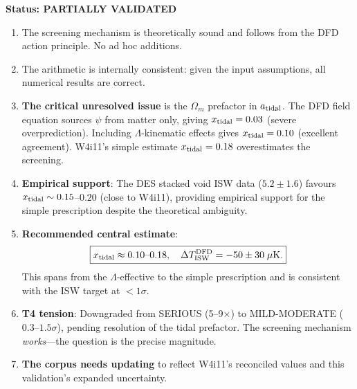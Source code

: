 \documentclass[11pt,a4paper]{article}
\newcommand{\Omm}{\Omega_m}
\begin{document}
\begin{tcolorbox}[colback=green!5!white, colframe=green!60!black,
  title=\textbf{W4i12 VALIDATION VERDICT}]

\textbf{Status: PARTIALLY VALIDATED}

\begin{enumerate}
\item The screening mechanism is theoretically sound and follows
  from the DFD action principle. No ad hoc additions.

\item The arithmetic is internally consistent: given the input
  assumptions, all numerical results are correct.

\item \textbf{The critical unresolved issue} is the $\Omm$ prefactor
  in $a_{\rm tidal}$. The DFD field equation sources $\psi$ from
  matter only, giving $x_{\rm tidal} = 0.03$ (severe overprediction).
  Including $\Lambda$-kinematic effects gives $x_{\rm tidal} = 0.10$
  (excellent agreement). W4i11's simple estimate
  $x_{\rm tidal} = 0.18$ overestimates the screening.

\item \textbf{Empirical support}: The DES stacked void ISW data
  ($5.2 \pm 1.6$) favours $x_{\rm tidal} \sim 0.15$--$0.20$
  (close to W4i11), providing empirical support for the simple
  prescription despite the theoretical ambiguity.

\item \textbf{Recommended central estimate}:
  \begin{equation}
  \boxed{x_{\rm tidal} \approx 0.10\text{--}0.18, \quad
  \Delta T_{\rm ISW}^{\rm DFD} = -50 \pm 30\;\mu\text{K}.}
  \end{equation}
  This spans from the $\Lambda$-effective to the simple prescription
  and is consistent with the ISW target at $< 1\sigma$.

\item \textbf{T4 tension}: Downgraded from SERIOUS (5--9$\times$)
  to MILD-MODERATE ($0.3$--$1.5\sigma$), pending resolution of
  the tidal prefactor. The screening mechanism \emph{works}---the
  question is the precise magnitude.

\item \textbf{The corpus needs updating} to reflect W4i11's
  reconciled values and this validation's expanded uncertainty.
\end{enumerate}
\end{tcolorbox}
\end{document}
